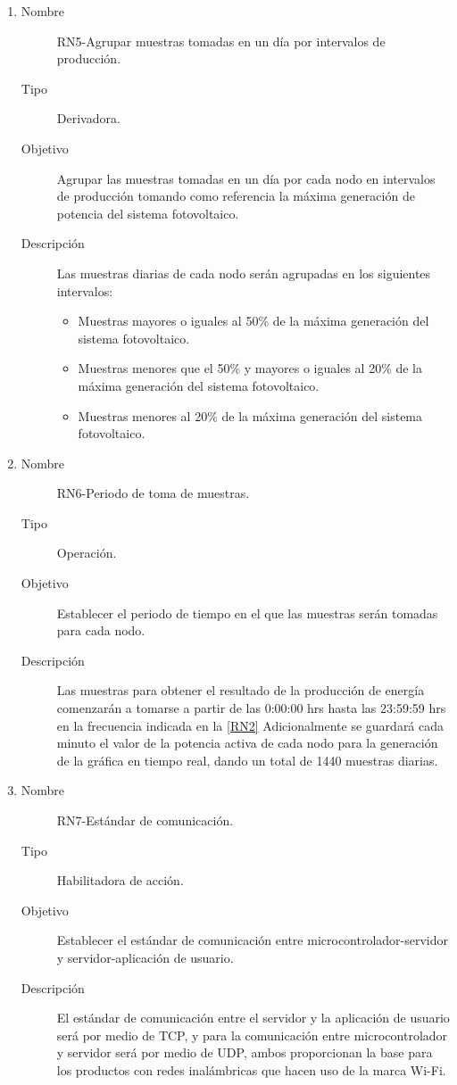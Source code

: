 \begin{enumerate}[label=RN\arabic*.]
\item \label{RN5}
		\begin{description}
			\item[Nombre] RN5-Agrupar muestras tomadas en un día por intervalos de producción.
			\item[Tipo] Derivadora.
			\item[Objetivo] Agrupar las muestras tomadas en un día por cada nodo en intervalos de producción tomando como referencia la máxima generación de potencia del sistema fotovoltaico. 
			\item[Descripción] Las muestras diarias de cada nodo serán agrupadas en los siguientes intervalos:
			\begin{itemize}
				\item Muestras mayores o iguales al 50\% de la máxima generación del sistema fotovoltaico.  
				\item Muestras menores que el 50\% y mayores o iguales al 20\% de la máxima generación del sistema fotovoltaico. 
				\item Muestras menores al 20\% de la máxima generación del sistema fotovoltaico. 
			\end{itemize}
		\end{description}

\item \label{RN6}
		\begin{description}
			\item[Nombre] RN6-Periodo de toma de muestras.
			\item[Tipo] Operación.
			\item[Objetivo] Establecer el periodo de tiempo en el que las muestras serán tomadas para cada nodo.
			\item[Descripción] Las muestras para obtener el resultado de la producción de energía comenzarán a tomarse a partir de las 0:00:00 hrs hasta las 23:59:59 hrs en la frecuencia indicada en la \ref{RN2} Adicionalmente se guardará cada minuto el valor de la potencia activa de cada nodo para la generación de la gráfica en tiempo real, dando un total de 1440 muestras diarias.		
		\end{description}
		
\item \label{RN7}
		\begin{description}
			\item[Nombre] RN7-Estándar de comunicación.
			\item[Tipo] Habilitadora de acción.
			\item[Objetivo] Establecer el estándar de comunicación entre microcontrolador-servidor y servidor-aplicación de usuario.
			\item[Descripción] El estándar de comunicación entre el servidor y la aplicación de usuario será por medio de TCP, y para la comunicación entre microcontrolador y servidor será por medio de UDP, ambos proporcionan la base para los productos con redes inalámbricas que hacen uso de la marca Wi-Fi.
		\end{description}
		

\end{enumerate}
